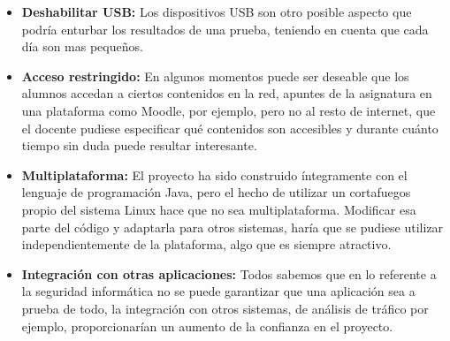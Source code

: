 \begin{itemize}

    \item {\bfseries Deshabilitar USB:} Los dispositivos USB son otro posible aspecto que podría enturbar los resultados de una prueba, teniendo en cuenta que cada día son mas pequeños.

    \item {\bfseries Acceso restringido:} En algunos momentos puede ser deseable que los alumnos accedan a ciertos contenidos en la red, apuntes de la asignatura en una plataforma como Moodle, por ejemplo, pero no al resto de internet, que el docente pudiese especificar qué contenidos son accesibles y durante cuánto tiempo sin duda puede resultar interesante.

    \item {\bfseries Multiplataforma:} El proyecto ha sido construido íntegramente con el lenguaje de programación Java, pero el hecho de utilizar un cortafuegos propio del sistema Linux hace que no sea multiplataforma. Modificar esa parte del código y adaptarla para otros sistemas, haría que se pudiese utilizar independientemente de la plataforma, algo que es siempre atractivo.

    \item {\bfseries Integración con otras aplicaciones:} Todos sabemos que en lo referente a la seguridad informática no se puede garantizar que una aplicación sea a prueba de todo, la integración con otros sistemas, de análisis de tráfico por ejemplo, proporcionarían un aumento de la confianza en el proyecto.

\end{itemize} 